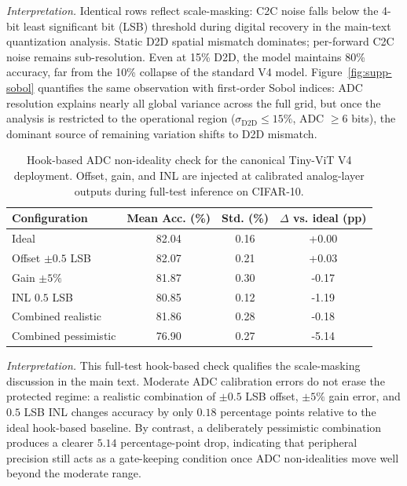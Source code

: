 \textit{Interpretation.} Identical rows reflect scale-masking: C2C noise falls below the 4-bit least significant bit (LSB) threshold during digital recovery in the main-text quantization analysis. Static D2D spatial mismatch dominates; per-forward C2C noise remains sub-resolution. Even at 15\% D2D, the model maintains 80\% accuracy, far from the 10\% collapse of the standard V4 model. Figure~\ref{fig:supp-sobol} quantifies the same observation with first-order Sobol indices: ADC resolution explains nearly all global variance across the full grid, but once the analysis is restricted to the operational region (\(\sigma_{\mathrm{D2D}} \le 15\%\), ADC \(\ge 6\) bits), the dominant source of remaining variation shifts to D2D mismatch.

\begin{table}[ht]
\centering
\caption{Hook-based ADC non-ideality check for the canonical Tiny-ViT V4 deployment. Offset, gain, and INL are injected at calibrated analog-layer outputs during full-test inference on CIFAR-10.}
\label{tab:adc-nonideality}
\begin{tabular}{lccc}
\toprule
\textbf{Configuration} & \textbf{Mean Acc. (\%)} & \textbf{Std. (\%)} & \textbf{\(\Delta\) vs. ideal (pp)} \\
\midrule
Ideal & 82.04 & 0.16 & +0.00 \\
Offset \(\pm 0.5\) LSB & 82.07 & 0.21 & +0.03 \\
Gain \(\pm 5\%\) & 81.87 & 0.30 & -0.17 \\
INL \(0.5\) LSB & 80.85 & 0.12 & -1.19 \\
Combined realistic & 81.86 & 0.28 & -0.18 \\
Combined pessimistic & 76.90 & 0.27 & -5.14 \\
\bottomrule
\end{tabular}
\end{table}

\textit{Interpretation.} This full-test hook-based check qualifies the scale-masking discussion in the main text. Moderate ADC calibration errors do not erase the protected regime: a realistic combination of \(\pm 0.5\) LSB offset, \(\pm 5\%\) gain error, and \(0.5\) LSB INL changes accuracy by only \(0.18\) percentage points relative to the ideal hook-based baseline. By contrast, a deliberately pessimistic combination produces a clearer \(5.14\) percentage-point drop, indicating that peripheral precision still acts as a gate-keeping condition once ADC non-idealities move well beyond the moderate range.

